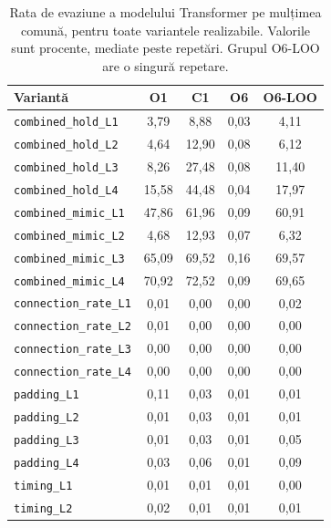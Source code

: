\begin{table}[!ht]
    \caption{Rata de evaziune a modelului Transformer pe mulțimea comună, pentru toate variantele realizabile. Valorile sunt procente, mediate peste repetări. Grupul O6-LOO are o singură repetare.}
    \centering\footnotesize
    \begin{tabular}{|l|c|c|c|c|}
        \hline
        \textbf{Variantă} & \textbf{O1} & \textbf{C1} & \textbf{O6} & \textbf{O6-LOO} \\
        \hline
        \texttt{combined\_hold\_L1} & 3,79 & 8,88 & 0,03 & 4,11 \\
        \hline
        \texttt{combined\_hold\_L2} & 4,64 & 12,90 & 0,08 & 6,12 \\
        \hline
        \texttt{combined\_hold\_L3} & 8,26 & 27,48 & 0,08 & 11,40 \\
        \hline
        \texttt{combined\_hold\_L4} & 15,58 & 44,48 & 0,04 & 17,97 \\
        \hline
        \texttt{combined\_mimic\_L1} & 47,86 & 61,96 & 0,09 & 60,91 \\
        \hline
        \texttt{combined\_mimic\_L2} & 4,68 & 12,93 & 0,07 & 6,32 \\
        \hline
        \texttt{combined\_mimic\_L3} & 65,09 & 69,52 & 0,16 & 69,57 \\
        \hline
        \texttt{combined\_mimic\_L4} & 70,92 & 72,52 & 0,09 & 69,65 \\
        \hline
        \texttt{connection\_rate\_L1} & 0,01 & 0,00 & 0,00 & 0,02 \\
        \hline
        \texttt{connection\_rate\_L2} & 0,01 & 0,00 & 0,00 & 0,00 \\
        \hline
        \texttt{connection\_rate\_L3} & 0,00 & 0,00 & 0,00 & 0,00 \\
        \hline
        \texttt{connection\_rate\_L4} & 0,00 & 0,00 & 0,00 & 0,00 \\
        \hline
        \texttt{padding\_L1} & 0,11 & 0,03 & 0,01 & 0,01 \\
        \hline
        \texttt{padding\_L2} & 0,01 & 0,03 & 0,01 & 0,01 \\
        \hline
        \texttt{padding\_L3} & 0,01 & 0,03 & 0,01 & 0,05 \\
        \hline
        \texttt{padding\_L4} & 0,03 & 0,06 & 0,01 & 0,09 \\
        \hline
        \texttt{timing\_L1} & 0,01 & 0,01 & 0,01 & 0,00 \\
        \hline
        \texttt{timing\_L2} & 0,02 & 0,01 & 0,01 & 0,01 \\

\end{tabular}
\end{table}
